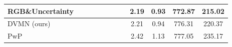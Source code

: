 \documentclass[letterpaper, 10 pt, conference]{ieeeconf}  \usepackage{geometry}
\begin{document}
\begin{table*}[t]
{\begin{tabular}{@{}lccccccccccc@{}}
			\multicolumn{1}{l|}{RGB\&Uncertainty \cite{Sparse_Uncertain}}                 & \multicolumn{1}{c|}{\checkmark}                                                        & \multicolumn{1}{c|}{\checkmark}                                                              & \multicolumn{1}{c|}{}                                                            & \multicolumn{1}{c|}{\checkmark}              & \multicolumn{1}{c|}{}                 & \multicolumn{1}{c|}{}                                                                 & \multicolumn{1}{c|}{\checkmark}                                                                & 2.19                                                                                 & 0.93                                                                                & 772.87                                                                            & 215.02                                                      \\ \midrule
			\multicolumn{1}{l|}{DVMN (ours)}                      & \multicolumn{1}{c|}{\checkmark}                                                        & \multicolumn{1}{c|}{\checkmark}                                                              & \multicolumn{1}{c|}{\checkmark}                                                         & \multicolumn{1}{c|}{}                 & \multicolumn{1}{c|}{}                 & \multicolumn{1}{c|}{}                                                                 & \multicolumn{1}{c|}{}                                                                   & 2.21                                                                                 & 0.94                                                                                & 776.31                                                                            & 220.37                                                      \\ \midrule
			\multicolumn{1}{l|}{PwP \cite{PWP}}                              & \multicolumn{1}{c|}{\checkmark}                                                        & \multicolumn{1}{c|}{\checkmark}                                                              & \multicolumn{1}{c|}{}                                                            & \multicolumn{1}{c|}{\checkmark}              & \multicolumn{1}{c|}{\checkmark}                 & \multicolumn{1}{c|}{\checkmark}                                                              & \multicolumn{1}{c|}{}                                                                   & 2.42                                                                                 & 1.13                                                                                & 777.05                                                                            & 235.17                                                      \\

\end{tabular}}
\end{table*}
\end{document}
